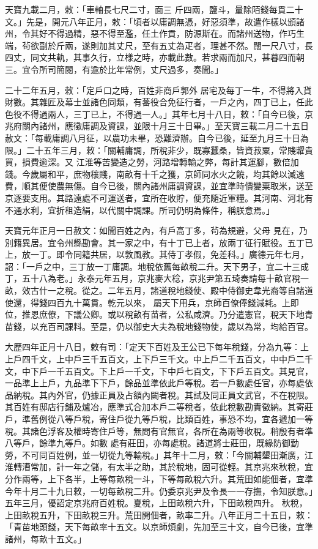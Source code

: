 \begin{pinyinscope}
 天寶九載二月，敕：「車軸長七尺二寸，面三
 斤四兩，鹽斗，量除陌錢每貫二十文。」先是，開元八年正月，敕：「頃者以庸調無憑，好惡須準，故遣作樣以頒諸州，令其好不得過精，惡不得至濫，任土作貢，防源斯在。而諸州送物，作巧生端，茍欲副於斤兩，遂則加其丈尺，至有五丈為疋者，理甚不然。闊一尺八寸，長四丈，同文共軌，其事久行，立樣之時，亦載此數。若求兩而加尺，甚暮四而朝三。宜令所司簡閱，有逾於比年常例，丈尺過多，奏聞。」



 二十二年五月，敕：「定戶口之時，百姓非商戶郭外
 居宅及每丁一牛，不得將入貨財數。其雜匠及幕士並諸色同類，有蕃役合免征行者，一戶之內，四丁已上，任此色役不得過兩人，三丁已上，不得過一人。」其年七月十八日，敕：「自今已後，京兆府關內諸州，應徵庸調及資課，並限十月三十日畢。」至天寶三載二月二十五日赦文：「每載庸調八月征，以農功未畢，恐難濟辦。自今已後，延至九月三十日為限。」二十五年三月，敕：「關輔庸調，所稅非少，既寡蠶桑，皆資菽粟，常賤糶貴買，損費逾深。又
 江淮等苦變造之勞，河路增轉輸之弊，每計其運腳，數倍加錢。今歲屬和平，庶物穰賤，南畝有十千之獲，京師同水火之饒，均其餘以減遠費，順其便使農無傷。自今已後，關內諸州庸調資課，並宜準時價變粟取米，送至京逐要支用。其路遠處不可運送者，宜所在收貯，便充隨近軍糧。其河南、河北有不通水利，宜折租造絹，以代關中調課。所司仍明為條件，稱朕意焉。」



 天寶元年正月一日赦文：如聞百姓之內，有戶高丁多，茍為規避，父母
 見在，乃別籍異居。宜令州縣勘會。其一家之中，有十丁已上者，放兩丁征行賦役。五丁已上，放一丁。即令同籍共居，以敦風教。其侍丁孝假，免差科。」廣德元年七月，詔：「一戶之中，三丁放一丁庸調。地稅依舊每畝稅二升。天下男子，宜二十三成丁，五十八為老。」永泰元年五月，京兆麥大稔，京兆尹第五琦奏請每十畝官稅一畝，效古什一之稅。從之。二年五月，諸道稅地錢使、殿中侍御史韋光裔等自諸道使還，得錢四百九十萬貫。乾元以來，
 屬天下用兵，京師百僚俸錢減耗。上即位，推恩庶僚，下議公卿。或以稅畝有苗者，公私咸濟。乃分遣憲官，稅天下地青苗錢，以充百司課料。至是，仍以御史大夫為稅地錢物使，歲以為常，均給百官。



 大歷四年正月十八日，敕有司：「定天下百姓及王公已下每年稅錢，分為九等：上上戶四千文，上中戶三千五百文，上下戶三千文。中上戶二千五百文，中中戶二千文，中下戶一千五百文。下上戶一千文，下中戶七百文，下下戶五百文。其見官，
 一品準上上戶，九品準下下戶，餘品並準依此戶等稅。若一戶數處任官，亦每處依品納稅。其內外官，仍據正員及占額內闕者稅。其試及同正員文武官，不在稅限。其百姓有邸店行鋪及爐冶，應準式合加本戶二等稅者，依此稅數勘責徵納。其寄莊戶，準舊例從八等戶稅，寄住戶從九等戶稅，比類百姓，事恐不均，宜各遞加一等稅。其諸色浮客及權時寄住戶等，無問有官無官，各所在為兩等收稅。稍殷有者準八等戶，餘準九等戶。如數
 處有莊田，亦每處稅。諸道將士莊田，既緣防御勤勞，不可同百姓例，並一切從九等輸稅。」其年十二月，敕：「今關輔墾田漸廣，江淮轉漕常加，計一年之儲，有太半之助，其於稅地，固可從輕。其京兆來秋稅，宜分作兩等，上下各半，上等每畝稅一斗，下等每畝稅六升。其荒田如能佃者，宜準今年十月二十九日敕，一切每畝稅二升。仍委京兆尹及令長一一存撫，令知朕意。」五年三月，優詔定京兆府百姓稅。夏稅，上田畝稅六升，下田畝稅四升。
 秋稅，上田畝稅五升，下田畝稅三升。荒田開佃者，畝率二升。八年正月二十五日，敕：「青苗地頭錢，天下每畝率十五文。以京師煩劇，先加至三十文，自今已後，宜準諸州，每畝十五文。」




\end{pinyinscope}
